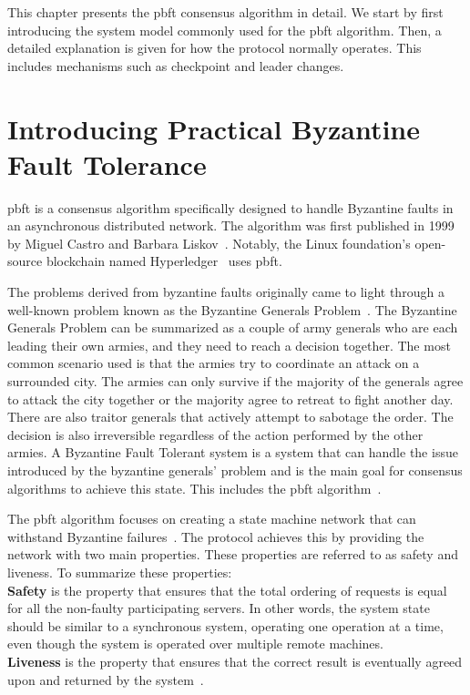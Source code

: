 This chapter presents the \acl{pbft} consensus algorithm in detail.
We start by first introducing the system model commonly used for the \ac{pbft} algorithm. Then, a detailed explanation is given for how the protocol normally operates. This includes mechanisms such as checkpoint and leader changes.

\section{Introducing Practical Byzantine Fault Tolerance}
\acl{pbft} is a consensus algorithm specifically designed to handle Byzantine faults in an asynchronous distributed network. The algorithm was first published in 1999 by Miguel Castro and Barbara Liskov~\cite{PAPER:OGPBFT}.
Notably, the Linux foundation's open-source blockchain named Hyperledger~\cite{WEB:PBFTGeeks, SLIDES:PBFT} uses \ac{pbft}.

The problems derived from byzantine faults originally came to light through a well-known problem known as the Byzantine Generals Problem~\cites{WEB:BFTInfo}{ART:lamportByzGenProb}[p.~240-253]{BOOK:BuildDepDistSyst}.
The Byzantine Generals Problem can be summarized as a couple of army generals who are each leading their own armies, and they need to reach a decision together. The most common scenario used is that the armies try to coordinate an attack on a surrounded city. The armies can only survive if the majority of the generals agree to attack the city together or the majority agree to retreat to fight another day. There are also traitor generals that actively attempt to sabotage the order. The decision is also irreversible regardless of the action performed by the other armies. A Byzantine Fault Tolerant system is a system that can handle the issue introduced by the byzantine generals’ problem and is the main goal for consensus algorithms to achieve this state. This includes the \ac{pbft} algorithm~\cite{WEB:BFTInfo, ART:lamportByzGenProb}.

The \ac{pbft} algorithm focuses on creating a state machine network that can withstand Byzantine failures~\cite[p.~456]{BOOK:MVstandver3}. The protocol achieves this by providing the network with two main properties. These properties are referred to as safety and liveness.
To summarize these properties:\\

\textbf{Safety} is the property that ensures that the total ordering of requests is equal for all the non-faulty participating servers. In other words, the system state should be similar to a synchronous system, operating one operation at a time, even though the system is operated over multiple remote machines.\\
\textbf{Liveness} is the property that ensures that the correct result is eventually agreed upon and returned by the system~\cites[p.~456]{BOOK:MVstandver3}{WEB:ConsesAlgo}[p.~2]{PAPER:OGPBFT}{SLIDES:PBFT}[p.~403]{PAPER:PBFTRecovery}[p.~257]{BOOK:BuildDepDistSyst}.

